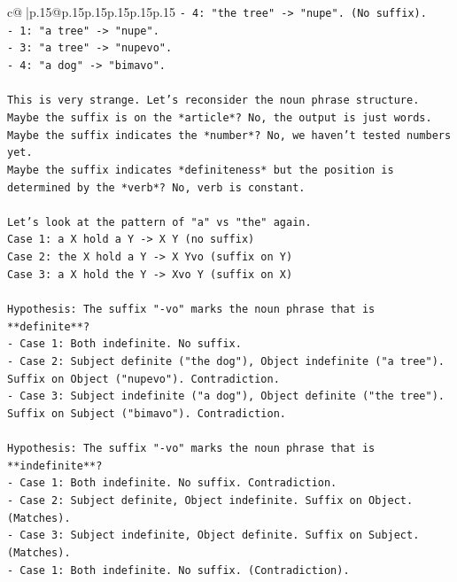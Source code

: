\documentclass{article}
\begin{document}
{\begin{supertabular}{c@{$\;$}|p{.15\linewidth}@{}p{.15\linewidth}p{.15\linewidth}p{.15\linewidth}p{.15\linewidth}p{.15\linewidth}}
{{{\texttt{{-} 4: "the tree" {-}> "nupe". (No suffix).} \\
\texttt{{-} 1: "a tree" {-}> "nupe".} \\
\texttt{{-} 3: "a tree" {-}> "nupevo".} \\
\texttt{{-} 4: "a dog" {-}> "bimavo".} \\
\\ 
\texttt{This is very strange. Let's reconsider the noun phrase structure.} \\
\texttt{Maybe the suffix is on the *article*? No, the output is just words.} \\
\texttt{Maybe the suffix indicates the *number*? No, we haven't tested numbers yet.} \\
\texttt{Maybe the suffix indicates *definiteness* but the position is determined by the *verb*? No, verb is constant.} \\
\\ 
\texttt{Let's look at the pattern of "a" vs "the" again.} \\
\texttt{Case 1: a X hold a Y {-}> X Y (no suffix)} \\
\texttt{Case 2: the X hold a Y {-}> X Yvo (suffix on Y)} \\
\texttt{Case 3: a X hold the Y {-}> Xvo Y (suffix on X)} \\
\\ 
\texttt{Hypothesis: The suffix "{-}vo" marks the noun phrase that is **definite**?} \\
\texttt{{-} Case 1: Both indefinite. No suffix.} \\
\texttt{{-} Case 2: Subject definite ("the dog"), Object indefinite ("a tree"). Suffix on Object ("nupevo"). Contradiction.} \\
\texttt{{-} Case 3: Subject indefinite ("a dog"), Object definite ("the tree"). Suffix on Subject ("bimavo"). Contradiction.} \\
\\ 
\texttt{Hypothesis: The suffix "{-}vo" marks the noun phrase that is **indefinite**?} \\
\texttt{{-} Case 1: Both indefinite. No suffix. Contradiction.} \\
\texttt{{-} Case 2: Subject definite, Object indefinite. Suffix on Object. (Matches).} \\
\texttt{{-} Case 3: Subject indefinite, Object definite. Suffix on Subject. (Matches).} \\
\texttt{{-} Case 1: Both indefinite. No suffix. (Contradiction).} \\
}}}
\end{supertabular}}
\end{document}
